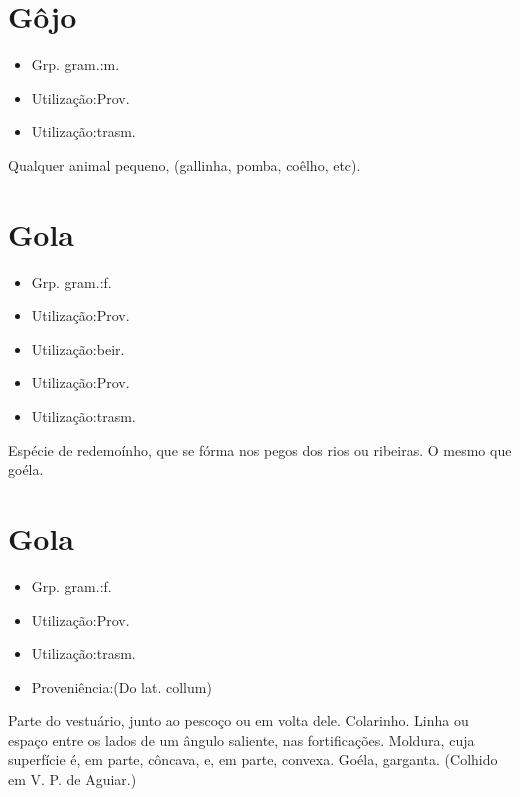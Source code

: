 \section{Gôjo}
\begin{itemize}
\item {Grp. gram.:m.}
\end{itemize}
\begin{itemize}
\item {Utilização:Prov.}
\end{itemize}
\begin{itemize}
\item {Utilização:trasm.}
\end{itemize}
Qualquer animal pequeno, (gallinha, pomba, coêlho, etc).
\section{Gola}
\begin{itemize}
\item {Grp. gram.:f.}
\end{itemize}
\begin{itemize}
\item {Utilização:Prov.}
\end{itemize}
\begin{itemize}
\item {Utilização:beir.}
\end{itemize}
\begin{itemize}
\item {Utilização:Prov.}
\end{itemize}
\begin{itemize}
\item {Utilização:trasm.}
\end{itemize}
Espécie de redemoínho, que se fórma nos pegos dos rios ou ribeiras.
O mesmo que \textunderscore goéla\textunderscore .
\section{Gola}
\begin{itemize}
\item {Grp. gram.:f.}
\end{itemize}
\begin{itemize}
\item {Utilização:Prov.}
\end{itemize}
\begin{itemize}
\item {Utilização:trasm.}
\end{itemize}
\begin{itemize}
\item {Proveniência:(Do lat. \textunderscore collum\textunderscore )}
\end{itemize}
Parte do vestuário, junto ao pescoço ou em volta dele.
Colarinho.
Linha ou espaço entre os lados de um ângulo saliente, nas fortificações.
Moldura, cuja superfície é, em parte, côncava, e, em parte, convexa.
Goéla, garganta. (Colhido em V. P. de Aguiar.)
